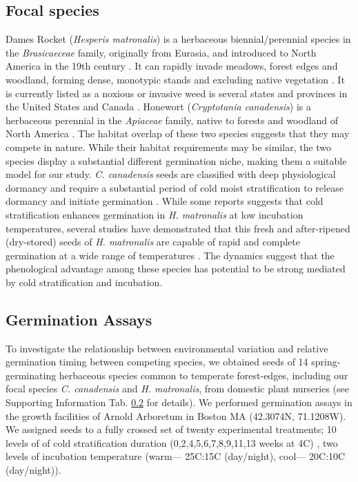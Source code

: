 \documentclass{article}\usepackage[]{graphicx}\usepackage[]{color}
\begin{document}
\subsection{Focal species}
 Dames Rocket (\textit{Hesperis matronalis}) is a herbaceous biennial/perennial species in the \textit{Brasicaeceae} family, originally from Eurasia, and introduced to North America in the 19th century \citep{Francis:2009wz}. It  can rapidly invade  meadows, forest edges and woodland, forming dense, monotypic stands and excluding native vegetation \citep{Francis:2009wz}. It is currently listed as a noxious or invasive weed is several states and provinces in the United States and Canada \citep{Susko:2008ut}. Honewort (\textit{Cryptotania canadensis}) is a herbaceous perennial in the \textit{Apiaceae} family, native to forests and woodland of North America \citep{Hawkins:2007vb}. The  habitat overlap of these two species suggests that they may compete in nature. While their habitat requirements may be similar, the two species display a substantial different germination niche, making them a suitable model for our study. \textit{C. canadensis} seeds are classified with deep physiological dormancy and require a substantial period of cold moist stratification to release dormancy and initiate germination \citep{Baskin:1988um}. While some reports suggests that cold stratification enhances germination in \textit{H. matronalis} at low incubation temperatures, several studies have demonstrated that this fresh and after-ripened (dry-stored) seeds of \textit{H. matronalis} are capable of rapid and complete germination at a wide range of  temperatures \citep{Susko:2008ut}. The dynamics suggest that the phenological advantage among these species has potential to be strong mediated by cold stratification and incubation.  

\subsection{Germination Assays}

To investigate the relationship between environmental variation and relative germination timing between competing species, we obtained seeds of 14 spring-germinating herbaceous species common to temperate forest-edges, including our focal species  \textit{C. canadensis} and \textit{H. matronalis}, from domestic plant nurseries (see Supporting Information Tab. \ref{} for details). We performed germination assays in the growth facilities of Arnold Arboretum in Boston MA (42.3074\degree N, 71.1208\degree W). We assigned seeds to a fully crossed set of twenty experimental treatments; 10 levels of of cold stratification duration (0,2,4,5,6,7,8,9,11,13 weeks at 4\degree C) , two levels of incubation temperature (warm--- 25\degree C:15\degree C (day/night), cool--- 20\degree C:10\degree C (day/night)).
\end{document}
